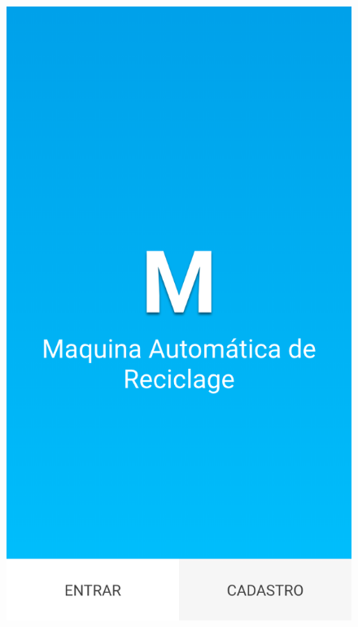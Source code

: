 \begin{figure}[!ht]
	\centering
		\includegraphics[scale=0.2]{figuras/software/get-in.png}

\end{figure}
